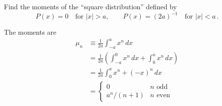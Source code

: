 

Find the moments of the ``square distribution'' defined by
\begin{equation*}
  P(x) = 0 \quad \text{for }|x|>a, \qquad P(x)=(2a)^{-1} \quad \text{for }|x|<a
  \, .
\end{equation*}


The moments are
\begin{align*}
  \mu_n
  &\equiv \frac{1}{2a} \int_{-a}^a x^n \, dx \\
  &= \frac{1}{2a} \left( \int_{-a}^0 x^n \, dx + \int_0^a x^n \, dx \right) \\
  &= \frac{1}{2a}\int_0^a x^n + (-x)^n \, dx \\
  &= \left\{
    \begin{array}{ll}
    0 & n \text{ odd} \\
    a^n/(n+1) & n \text{ even}
    \end{array}
  \right.
\end{align*}
